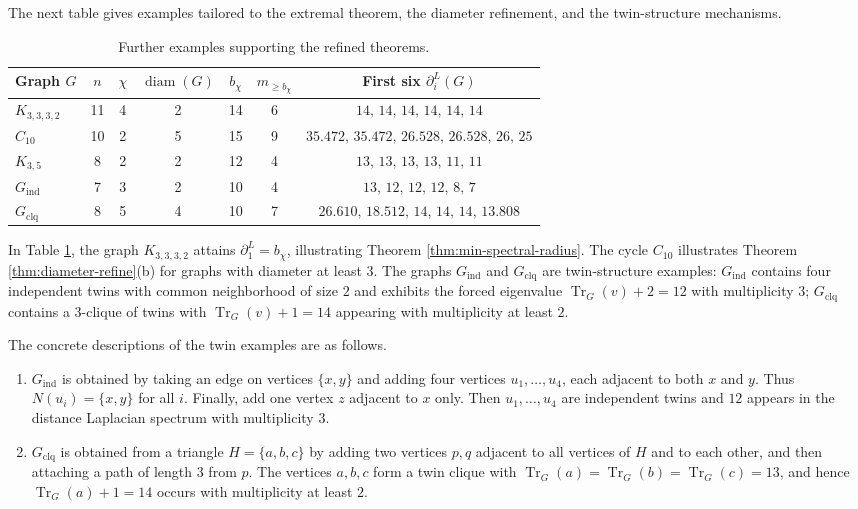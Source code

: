 \documentclass[12pt]{article}
\newcommand{\Tr}{\operatorname{Tr}}
\newcommand{\diam}{\operatorname{diam}}
\theoremstyle{plain}
\theoremstyle{definition}
\begin{document}
\noindent  The next table gives examples tailored to the extremal theorem, the diameter refinement, and the twin-structure mechanisms.

\begin{table}[H]
    \centering
    \small
    \begin{tabular}{@{}lcccccc@{}}
        \toprule
        Graph $G$ & $n$ & $\chi$ & $\diam(G)$ & $b_\chi$ & $m_{\ge b_\chi}$ & First six $\partial_i^L(G)$ \\
        \midrule
        $K_{3,3,3,2}$ & 11 & 4 & 2 & 14 & 6 &
        $14,\,14,\,14,\,14,\,14,\,14$ \\
        $C_{10}$ & 10 & 2 & 5 & 15 & 9 &
        $35.472,\,35.472,\,26.528,\,26.528,\,26,\,25$ \\
        $K_{3,5}$ & 8 & 2 & 2 & 12 & 4 &
        $13,\,13,\,13,\,13,\,11,\,11$ \\
        $G_{\mathrm{ind}}$ & 7 & 3 & 2 & 10 & 4 &
        $13,\,12,\,12,\,12,\,8,\,7$ \\
        $G_{\mathrm{clq}}$ & 8 & 5 & 4 & 10 & 7 &
        $26.610,\,18.512,\,14,\,14,\,14,\,13.808$ \\
        \bottomrule
    \end{tabular}
    \caption{Further examples supporting the refined theorems.}
    \label{table 2}
\end{table}

\noindent In Table \ref{table 2}, the graph $K_{3,3,3,2}$ attains $\partial_1^L=b_\chi$, illustrating Theorem
\ref{thm:min-spectral-radius}. The cycle $C_{10}$ illustrates Theorem \ref{thm:diameter-refine}(b) for graphs with diameter at
least $3$. The graphs $G_{\mathrm{ind}}$ and $G_{\mathrm{clq}}$ are twin-structure examples:
$G_{\mathrm{ind}}$ contains four independent twins with common neighborhood of size $2$ and exhibits the forced eigenvalue
$\Tr_G(v)+2=12$ with multiplicity $3$; $G_{\mathrm{clq}}$ contains a $3$-clique of twins with
$\Tr_G(v)+1=14$ appearing with multiplicity at least $2$.

\noindent The concrete descriptions of the twin examples are as follows.
\begin{enumerate}[noitemsep]
    \item $G_{\mathrm{ind}}$ is obtained by taking an edge on vertices $\{x,y\}$ and adding four vertices
    $u_1,\dots,u_4$, each adjacent to both $x$ and $y$. Thus $N(u_i)=\{x,y\}$ for all $i$. Finally, add one vertex $z$
    adjacent to $x$ only. Then $u_1,\dots,u_4$ are independent twins and $12$ appears in the distance Laplacian spectrum with
    multiplicity $3$.
    \item $G_{\mathrm{clq}}$ is obtained from a triangle $H=\{a,b,c\}$ by adding two vertices $p,q$ adjacent to all vertices of
    $H$ and to each other, and then attaching a path of length $3$ from $p$. The vertices $a,b,c$ form a twin clique with
    $\Tr_G(a)=\Tr_G(b)=\Tr_G(c)=13$, and hence $\Tr_G(a)+1=14$ occurs with multiplicity at least $2$.
\end{enumerate}
\end{document}
